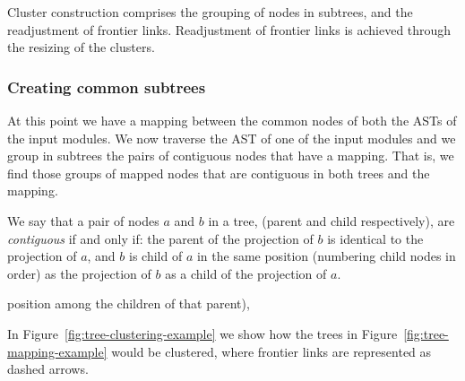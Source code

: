 Cluster construction comprises the grouping of nodes in subtrees,
and the readjustment of frontier links. Readjustment of frontier links is achieved
through the resizing of the clusters.


\subsubsection{Creating common subtrees}

At this point we have a mapping between the common nodes of both the
ASTs of the input modules. We now traverse the AST of one of the input
modules and we group in subtrees the pairs of contiguous nodes that
have a mapping. That is, we find those groups of mapped nodes that
are contiguous in both trees and the mapping.

We say that a pair of nodes $a$ and $b$ in a tree, (parent and child respectively),
are \emph{contiguous} if and only if: the parent of the projection of $b$
is identical to the projection of $a$, and $b$ is child of $a$
in the same position (numbering child nodes in order) as the projection
of $b$ as a child of the projection of $a$.

position among the children of that parent),

In Figure~\ref{fig:tree-clustering-example} we show how the trees
in Figure~\ref{fig:tree-mapping-example} would be clustered, where frontier links
are represented as dashed arrows.

